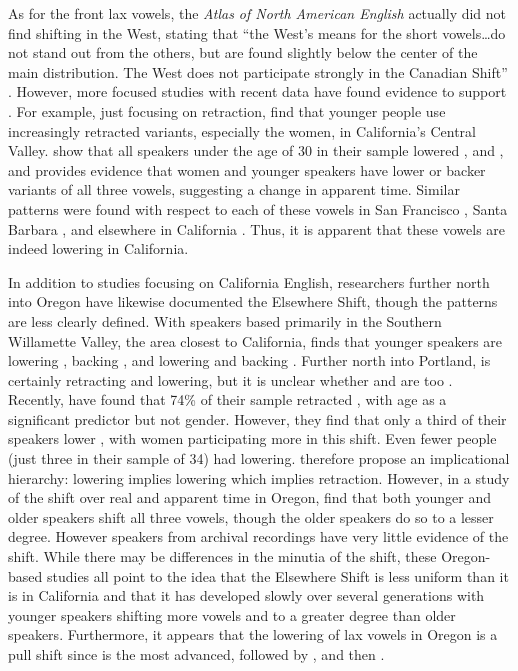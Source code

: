 As for the front lax vowels, the \textit{Atlas of North American English} actually did not find shifting in the West, stating that ``the West’s means for the short vowels\ldots do not stand out from the others, but are found slightly below the center of the main distribution. The West does not participate strongly in the Canadian Shift'' \citep[284--285]{labov_2006}. However, more focused studies with recent data have found evidence to support \citet{hinton_etal_1987}. For example, just focusing on \trap retraction, \citet[16]{donofrio_etal_2017_pads} find that younger people use increasingly retracted variants, especially the women, in California's Central Valley. \citet{kennedy_grama_2012} show that all speakers under the age of 30 in their sample lowered \trap, \dress and \kit, and \citet{holland_2014_diss} provides evidence that women and younger speakers have lower or backer variants of all three vowels, suggesting a change in apparent time. Similar patterns were found with respect to each of these vowels in San Francisco \citep{hall_lew_etal_2015, cardoso_etal_2016_pads}, Santa Barbara \citep{janoff_2018}, and elsewhere in California \citep{brotherton_etal_2019}. Thus, it is apparent that these vowels are indeed lowering in California.

In addition to studies focusing on California English, researchers further north into Oregon have likewise documented the Elsewhere Shift, though the patterns are less clearly defined. With speakers based primarily in the Southern Willamette Valley, the area closest to California, \citet{nelson_2011} finds that younger speakers are lowering \kit, backing \dress, and lowering and backing \trap. Further north into Portland, \trap is certainly retracting and lowering, but it is unclear whether \dress and \kit are too \citep{conn_2000_diss, becker_etal_2013}. Recently, \citet[116--118]{becker_etal_2016_pads}  have found that 74\% of their sample retracted \trap, with age as a significant predictor but not gender. However, they find that only a third of their speakers lower \dress, with women participating more in this shift. Even fewer people (just three in their sample of 34) had \kit lowering. \citeauthor{becker_etal_2016_pads} therefore propose an implicational hierarchy: \kit lowering implies \dress lowering which implies \trap retraction. However, in a study of the shift over real and apparent time in Oregon, \citet{mclarty_etal_2016} find that both younger and older speakers shift all three vowels, though the older speakers do so to a lesser degree. However speakers from archival recordings have very little evidence of the shift. While there may be differences in the minutia of the shift, these Oregon-based studies all point to the idea that the Elsewhere Shift is less uniform than it is in California and that it has developed slowly over several generations with younger speakers shifting more vowels and to a greater degree than older speakers. Furthermore, it appears that the lowering of lax vowels in Oregon is a pull shift since \trap is the most advanced, followed by \dress, and then \kit.

